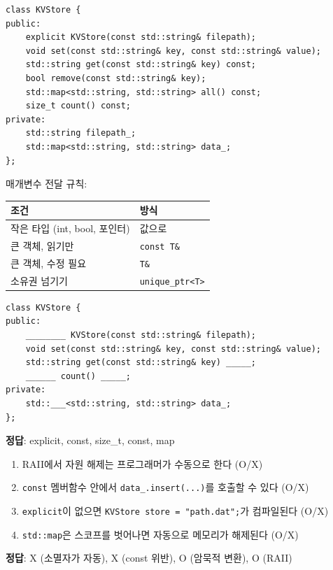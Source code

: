 \documentclass[11pt,a4paper]{article}
\newcommand{\code}[1]{\texttt{#1}}
\begin{document}
\begin{lstlisting}[style=cpp,title={store.h}]
class KVStore {
public:
    explicit KVStore(const std::string& filepath);
    void set(const std::string& key, const std::string& value);
    std::string get(const std::string& key) const;
    bool remove(const std::string& key);
    std::map<std::string, std::string> all() const;
    size_t count() const;
private:
    std::string filepath_;
    std::map<std::string, std::string> data_;
};
\end{lstlisting}

매개변수 전달 규칙:

\begin{tabularx}{\textwidth}{@{}lX@{}}
\toprule
\textbf{조건} & \textbf{방식} \\
\midrule
작은 타입 (int, bool, 포인터) & 값으로 \\
큰 객체, 읽기만 & \code{const T\&} \\
큰 객체, 수정 필요 & \code{T\&} \\
소유권 넘기기 & \code{unique\_ptr<T>} \\
\bottomrule
\end{tabularx}

\begin{quizbox}[title={Q1-1: KVStore 선언}]
\begin{lstlisting}[style=cpp,numbers=none]
class KVStore {
public:
    ________ KVStore(const std::string& filepath);
    void set(const std::string& key, const std::string& value);
    std::string get(const std::string& key) _____;
    ______ count() _____;
private:
    std::___<std::string, std::string> data_;
};
\end{lstlisting}
\textbf{정답}: explicit, const, size\_t, const, map
\end{quizbox}

\begin{quizbox}[title={Q1-2: O/X}]
\begin{enumerate}[nosep]
\item RAII에서 자원 해제는 프로그래머가 수동으로 한다 (O/X)
\item \code{const} 멤버함수 안에서 \code{data\_.insert(...)}를 호출할 수 있다 (O/X)
\item \code{explicit}이 없으면 \code{KVStore store = "path.dat";}가 컴파일된다 (O/X)
\item \code{std::map}은 스코프를 벗어나면 자동으로 메모리가 해제된다 (O/X)
\end{enumerate}
\textbf{정답}: X (소멸자가 자동), X (const 위반), O (암묵적 변환), O (RAII)
\end{quizbox}
\end{document}
